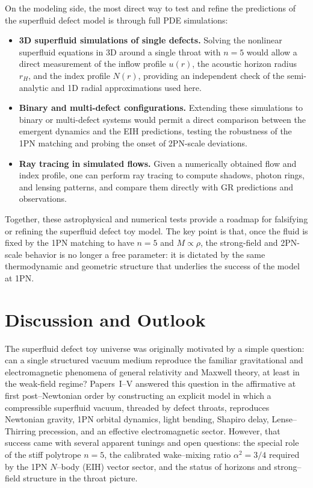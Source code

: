 \documentclass[11pt]{article}
\begin{document}
On the modeling side, the most direct way to test and refine the predictions
of the superfluid defect model is through full PDE simulations:
\begin{itemize}
  \item \textbf{3D superfluid simulations of single defects.}
        Solving the nonlinear superfluid equations in 3D around a single
        throat with \(n=5\) would allow a direct measurement of the inflow
        profile \(u(r)\), the acoustic horizon radius \(r_H\), and the
        index profile \(N(r)\), providing an independent check of the
        semi-analytic and 1D radial approximations used here.
  \item \textbf{Binary and multi-defect configurations.}
        Extending these simulations to binary or multi-defect systems would
        permit a direct comparison between the emergent dynamics and the
        EIH predictions, testing the robustness of the 1PN matching and
        probing the onset of 2PN-scale deviations.
  \item \textbf{Ray tracing in simulated flows.}
        Given a numerically obtained flow and index profile, one can
        perform ray tracing to compute shadows, photon rings, and lensing
        patterns, and compare them directly with GR predictions and
        observations.
\end{itemize}

Together, these astrophysical and numerical tests provide a roadmap for
falsifying or refining the superfluid defect toy model.  The key point is
that, once the fluid is fixed by the 1PN matching to have \(n=5\) and
\(M \propto \rho\), the strong-field and 2PN-scale behavior is no longer a
free parameter: it is dictated by the same thermodynamic and geometric
structure that underlies the success of the model at 1PN.

\section{Discussion and Outlook}
\label{sec:discussion}

The superfluid defect toy universe was originally motivated by a simple
question: can a single structured vacuum medium reproduce the familiar
gravitational and electromagnetic phenomena of general relativity and
Maxwell theory, at least in the weak-field regime?  Papers~I--V answered
this question in the affirmative at first post--Newtonian order by
constructing an explicit model in which a compressible superfluid vacuum,
threaded by defect throats, reproduces Newtonian gravity, 1PN orbital
dynamics, light bending, Shapiro delay, Lense--Thirring precession, and an
effective electromagnetic sector.  However, that success came with several
apparent tunings and open questions: the special role of the stiff
polytrope \(n=5\), the calibrated wake--mixing ratio \(\alpha^2=3/4\) required
by the 1PN $N$--body (EIH) vector sector, and the status of horizons and
strong--field structure in the throat picture.
\end{document}
